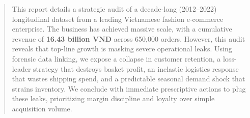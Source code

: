 
\begin{abstract}
This report details a strategic audit of a decade-long (2012--2022) longitudinal dataset from a leading Vietnamese fashion e-commerce enterprise. The business has achieved massive scale, with a cumulative revenue of \textbf{16.43 billion VND} across 650,000 orders. However, this audit reveals that top-line growth is masking severe operational leaks. Using forensic data linking, we expose a collapse in customer retention, a loss-leader strategy that destroys basket profit, an inelastic logistics response that wastes shipping spend, and a predictable seasonal demand shock that strains inventory. We conclude with immediate prescriptive actions to plug these leaks, prioritizing margin discipline and loyalty over simple acquisition volume.
\end{abstract}

